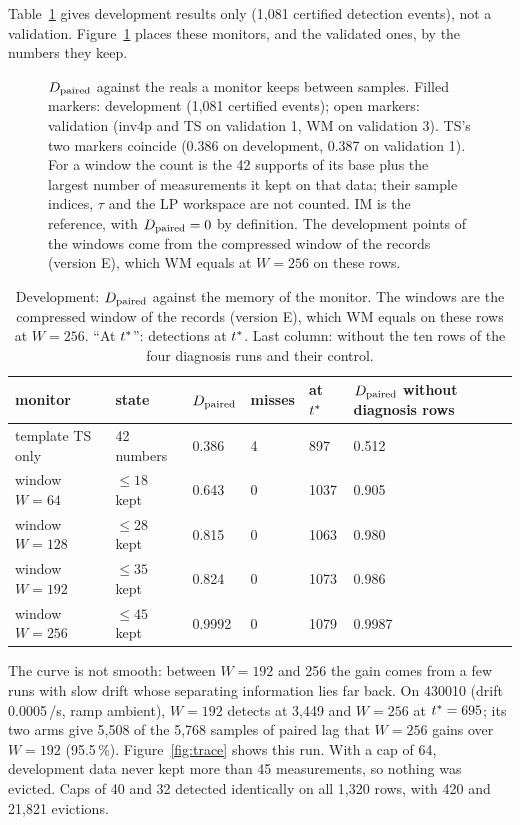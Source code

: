 Table~\ref{tab:dev} gives development results only (1,081 certified detection events), not a validation. Figure~\ref{fig:memory} places these monitors, and the validated ones, by the numbers they keep.

\begin{figure}[t]
\centering

\caption{$D_{\mathrm{paired}}$ against the reals a monitor keeps between samples. Filled markers: development (1,081 certified
events); open markers: validation (inv4p and TS on validation 1, WM on validation 3). TS's two markers coincide
(0.386 on development, 0.387 on validation 1). For a window the count is the 42
supports of its base plus the largest number of measurements it kept on that data; their sample indices, $\tau$ and
the LP workspace are not counted. IM is the reference, with $D_{\mathrm{paired}} = 0$ by definition. The development points of the windows come from the
compressed window of the records (version E), which WM equals at $W = 256$ on these rows.}
\label{fig:memory}
\end{figure}

\begin{table}[t]
\centering\small
\caption{Development: $D_{\mathrm{paired}}$ against the memory of the monitor. The windows are the compressed window of the
records (version E), which WM equals on these rows at $W = 256$. ``At $t^{\ast}$'': detections at $t^{\ast}$. Last column: without the ten rows of
the four diagnosis runs and their control.}\label{tab:dev}
\begin{tabular}{llllll}
\toprule
monitor & state & $D_{\mathrm{paired}}$ & misses & at $t^{\ast}$ & $D_{\mathrm{paired}}$ without diagnosis rows\\
\midrule
template TS only & 42 numbers & 0.386 & 4 & 897 & 0.512\\
window $W = 64$ & $\le18$ kept & 0.643 & 0 & 1037 & 0.905\\
window $W = 128$ & $\le28$ kept & 0.815 & 0 & 1063 & 0.980\\
window $W = 192$ & $\le35$ kept & 0.824 & 0 & 1073 & 0.986\\
window $W = 256$ & $\le45$ kept & 0.9992 & 0 & 1079 & 0.9987\\
\bottomrule
\end{tabular}
\end{table}

The curve is not smooth: between $W = 192$ and 256 the gain comes from a few runs with slow drift whose separating
information lies far back. On 430010 (drift 0.0005\,\degC/s, ramp ambient), $W = 192$ detects at 3,449 and $W = 256$ at
$t^{\ast} = 695$; its two arms give 5,508 of the 5,768 samples of paired lag that $W = 256$ gains over $W = 192$
(95.5\,\%). Figure~\ref{fig:trace} shows this run. With a cap of 64, development data never kept more than 45 measurements, so nothing was evicted. Caps of
40 and 32 detected identically on all 1,320 rows, with 420 and 21,821 evictions.

